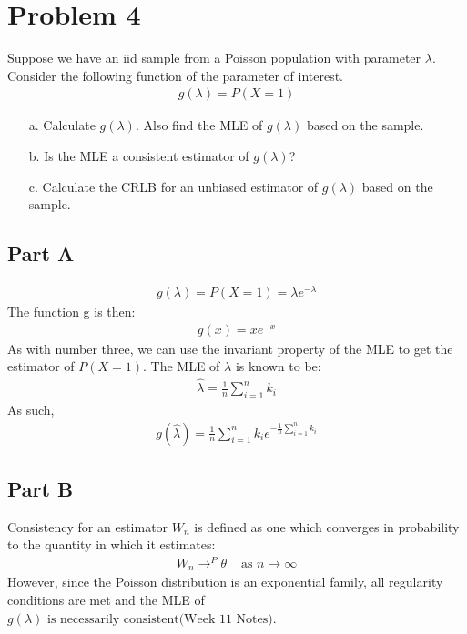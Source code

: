 \documentclass{article}
\begin{document}
\clearpage

\section*{Problem 4}
Suppose we have an iid sample from a Poisson population with parameter $\lambda$. Consider the following function of the parameter of interest.
\begin{align*}
g(\lambda) = P(X=1)
\end{align*}
\begin{enumerate}
\item[a.] Calculate $g(\lambda)$. Also find the MLE of $g(\lambda)$ based on the sample.
\item[b.] Is the MLE a consistent estimator of $g(\lambda)$?
\item[c.] Calculate the CRLB for an unbiased estimator of $g(\lambda)$ based on the sample.
\end{enumerate}
\subsection*{Part A}
\begin{align*}
g(\lambda) = P(X=1) = \lambda e^{-\lambda}
\end{align*}
The function g is then:
\begin{align*}
g(x) = x e^{-x}
\end{align*}
As with number three, we can use the invariant property of the MLE to get the estimator of $P(X=1)$.
The MLE of $\lambda$ is known to be:
\begin{align*}
\hat{\lambda} = \frac{1}{n} \sum_{i=1}^{n} k_i
\end{align*}
As such, 
\begin{align*}
\boxed{ g(\hat{\lambda}) = \frac{1}{n} \sum_{i=1}^{n} k_i e^{-\frac{1}{n} \sum_{i=1}^{n} k_i} }
\end{align*}
\subsection*{Part B}
Consistency for an estimator $W_n$ is defined as one which converges in probability to the quantity in which it estimates:
\begin{align*}
W_n \rightarrow^P \theta & \text{ as } n \rightarrow \infty
\end{align*}
However, since the Poisson distribution is an exponential family, all regularity conditions are met and the MLE of $\boxed{ g(\lambda) \text{ is necessarily consistent(Week 11 Notes)} }$.
\end{document}
